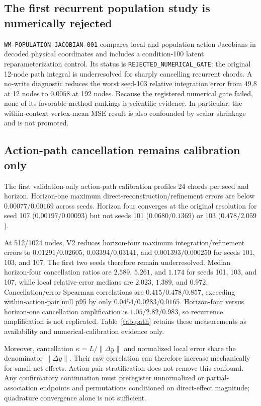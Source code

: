 \documentclass[10pt]{article}
\newcommand{\code}[1]{\texttt{#1}}
\begin{document}
\subsection{The first recurrent population study is numerically rejected}

\code{WM-POPULATION-JACOBIAN-001} compares local and population action
Jacobians in decoded physical coordinates and includes a condition-100 latent
reparameterization control.  Its status is
\code{REJECTED\_NUMERICAL\_GATE}: the original 12-node path integral is
underresolved for sharply cancelling recurrent chords.  A no-write diagnostic
reduces the worst seed-103 relative integration error from $49.8$ at 12 nodes
to $0.0058$ at 192 nodes.  Because the registered numerical gate failed, none
of its favorable method rankings is scientific evidence.  In particular, the
within-context vertex-mean MSE result is also confounded by scalar shrinkage
and is not promoted.

\subsection{Action-path cancellation remains calibration only}

The first validation-only action-path calibration profiles 24 chords per seed
and horizon.  Horizon-one maximum direct-reconstruction/refinement errors are
below $0.00077/0.00169$ across seeds.  Horizon four converges at the original
resolution for seed 107 ($0.00197/0.00093$) but not seeds 101
($0.0680/0.1369$) or 103 ($0.478/2.059$).

At 512/1024 nodes, V2 reduces horizon-four maximum
integration/refinement errors to $0.01291/0.02605$, $0.03394/0.03141$, and
$0.001393/0.000250$ for seeds 101, 103, and 107.  The first two seeds therefore
remain underresolved.  Median horizon-four cancellation ratios are $2.589$,
$5.261$, and $1.174$ for
seeds 101, 103, and 107, while local relative-error medians are $2.023$,
$1.389$, and $0.972$.  Cancellation/error Spearman correlations are
$0.415/0.478/0.857$, exceeding within-action-pair null p95 by only
$0.0454/0.0283/0.0165$.  Horizon-four versus horizon-one cancellation
amplification is $1.05/2.82/0.983$, so recurrence amplification is not
replicated.  Table~\ref{tab:path} retains these measurements as availability
and numerical-calibration evidence only.

Moreover, cancellation $\kappa=L/\lVert\Delta y\rVert$ and normalized local
error share the denominator $\lVert\Delta y\rVert$.  Their raw correlation can
therefore increase mechanically for small net effects.  Action-pair
stratification does not remove this confound.  Any confirmatory continuation
must preregister unnormalized or partial-association endpoints and permutations
conditioned on direct-effect magnitude; quadrature convergence alone is not
sufficient.
\end{document}

